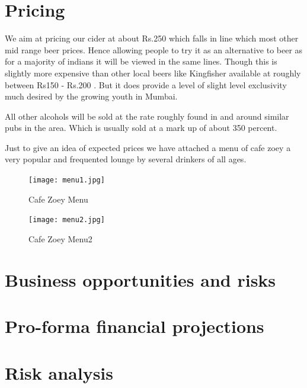 \documentclass{article}
\begin{document}
\section{Pricing}
We aim at pricing our cider at about Rs.250 which falls in line which most other mid range beer prices. Hence allowing people to try it as an alternative to beer as for a majority of indians it will be viewed in the same lines. Though this is slightly more expensive than other local beers like Kingfisher available at roughly between Rs150 - Rs.200 . But it does provide a level of slight level exclusivity much desired by the growing youth in Mumbai.

All other alcohols will be sold at the rate roughly found in and around similar pubs in the area. Which is usually sold at a mark up of about 350 percent.

Just to give an idea of expected prices we have attached a menu of cafe zoey a very popular and frequented lounge by several drinkers of all ages.

\begin{figure}[h!]
	\caption{Cafe Zoey Menu}
	\centering
		\texttt{[image: menu1.jpg]}
\end{figure}


\begin{figure}[h!]
	\caption{Cafe Zoey Menu2}
	\centering
		\texttt{[image: menu2.jpg]}
\end{figure}


\section{Business opportunities and risks}
\section{Pro-forma financial projections}
\section{Risk analysis}
\end{document}
